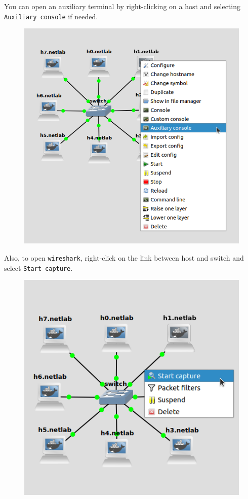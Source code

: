 \documentclass{../UTNetLab}
\begin{document}
    You can open an auxiliary terminal by right-clicking on a host and selecting \texttt{Auxiliary console} if needed.
    \begin{figure}[H]
        \centering
        \includegraphics[scale=1.6]{img/auxiliary}
    \end{figure}

    Also, to open \lstinline{wireshark}, right-click on the link between host and switch and select \texttt{Start capture}.
    \begin{figure}[H]
        \centering
        \includegraphics[scale=1.8]{img/capture}
    \end{figure}
\end{document}
